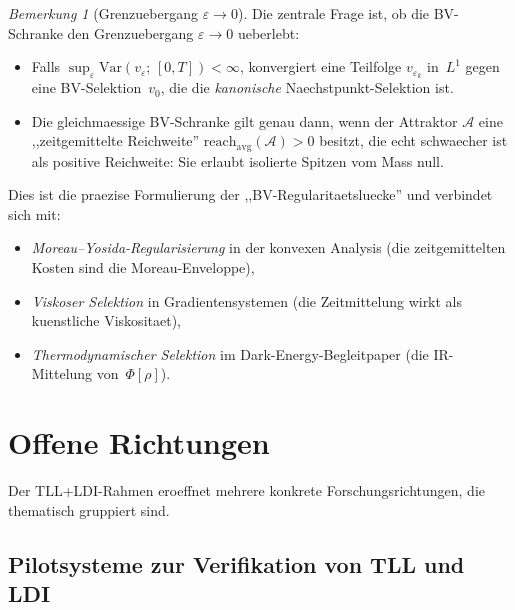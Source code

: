 \documentclass[12pt,a4paper]{article}
\theoremstyle{definition}
\theoremstyle{plain}
\theoremstyle{remark}
\newtheorem{remark}[definition]{Bemerkung}
\newcommand{\Var}{\mathrm{Var}}
\begin{document}
\begin{remark}[Grenzuebergang $\varepsilon \to 0$]
\label{rem:epsilon-limit}
Die zentrale Frage ist, ob die BV-Schranke den Grenzuebergang
$\varepsilon \to 0$ ueberlebt:
\begin{itemize}
\item Falls\; $\sup_\varepsilon \Var(v_\varepsilon;\,[0,T]) < \infty$,
  konvergiert eine Teilfolge $v_{\varepsilon_k}$ in~$L^1$ gegen eine
  BV-Selektion~$v_0$, die die \emph{kanonische} Naechstpunkt-Selektion
  ist.
\item Die gleichmaessige BV-Schranke gilt genau dann, wenn der
  Attraktor $\mathcal{A}$ eine ,,zeitgemittelte Reichweite''
  $\mathrm{reach}_{\mathrm{avg}}(\mathcal{A}) > 0$ besitzt, die
  echt schwaecher ist als positive Reichweite: Sie erlaubt isolierte
  Spitzen vom Mass null.
\end{itemize}
Dies ist die praezise Formulierung der ,,BV-Regularitaetsluecke'' und
verbindet sich mit:
\begin{itemize}
\item \emph{Moreau--Yosida-Regularisierung} in der konvexen Analysis
  (die zeitgemittelten Kosten sind die Moreau-Enveloppe),
\item \emph{Viskoser Selektion} in Gradientensystemen (die Zeitmittelung
  wirkt als kuenstliche Viskositaet),
\item \emph{Thermodynamischer Selektion} im Dark-Energy-Begleitpaper
  (die IR-Mittelung von~$\Phi[\rho]$).
\end{itemize}
\end{remark}


\section{Offene Richtungen}
\label{sec:open-directions}

Der TLL+LDI-Rahmen eroeffnet mehrere konkrete Forschungsrichtungen,
die thematisch gruppiert sind.

\subsection{Pilotsysteme zur Verifikation von TLL und LDI}
\end{document}
